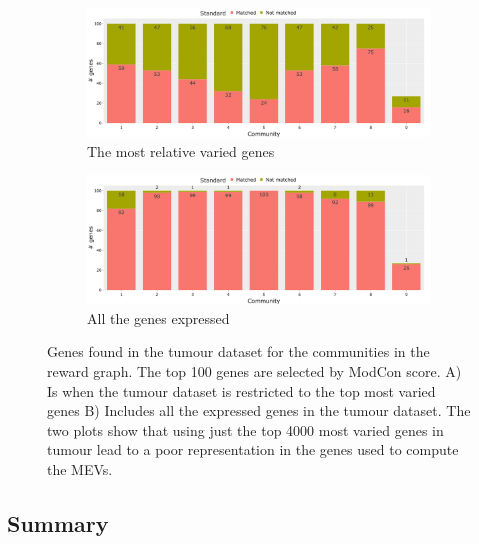 \begin{figure}[!htb]
    \centering
    \begin{subfigure}[b]{1.0\textwidth}
        \includegraphics[width=\textwidth,keepaspectratio]{Sections/Network_I/Resources/P0/4K_p0_modConMev_rep_norm3_4K_50TF_v3.png}
        \caption{The most relative varied genes}
        \label{fig:N_I:p0_mev_sel_rep}
    \end{subfigure}
    \begin{subfigure}[b]{1.0\textwidth}
        \centering
        \includegraphics[width=\textwidth,keepaspectratio]{Sections/Network_I/Resources/P0/13K_p0_modConMev_rep_norm3_4K_50TF_v3.png}
        \caption{All the genes expressed}
        \label{fig:N_I:p0_mev_all_rep}
    \end{subfigure}
    \caption{Genes found in the tumour dataset for the communities in the reward graph. The top 100 genes are selected by ModCon score. A) Is when the tumour dataset is restricted to the top most varied genes B) Includes all the expressed genes in the tumour dataset. The two plots show that using just the top 4000 most varied genes in tumour lead to a poor representation in the genes used to compute the MEVs.}
    \label{fig:N_I:p0_mev_rep}
\end{figure}



\subsection{Summary}

